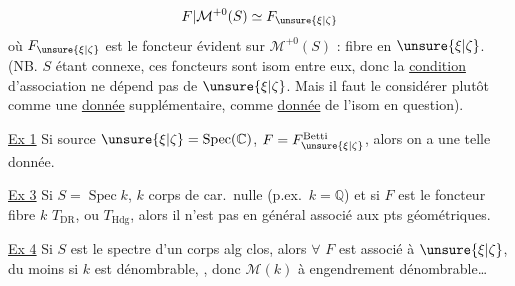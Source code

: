 \[
F|\mathcal{M}^{+0}(S)\simeq F_{\unsure{\xi|\zeta}}
\]
où $F_{\unsure{\xi|\zeta}}$ est le foncteur évident sur $\mathcal{M}^{+0}(S)$ : fibre en $\unsure{\xi|\zeta}$.
(NB. $S$ étant connexe, ces foncteurs sont isom entre eux, donc la \uline{condition} d'association ne dépend pas de $\unsure{\xi|\zeta}$. Mais il faut le considérer plutôt comme une \uline{donnée} supplémentaire, comme \uline{donnée} de l'isom en question).

\uline{Ex 1} Si source $\unsure{\xi|\zeta}=\operatorname{Spec}(\mathbb{C})$,  $F=F_{\unsure{\xi|\zeta}}^{\mathrm{Betti}}$, alors on a une telle donnée.

\uline{Ex 3} Si $S=\operatorname{Spec}k$, $k$ corps de car.\ nulle (p.ex.\ $k=\mathbb{Q}$) et si $F$ est le foncteur fibre  $k$ $T_{\mathrm{DR}}$,  ou $T_{\mathrm{Hdg}}$, alors il n'est pas en général associé aux pts géométriques.

\uline{Ex 4} Si  $S$ est le spectre d'un corps alg clos, alors $\forall$ $F$ est associé à $\unsure{\xi|\zeta}$, du moins si $k$ est dénombrable, , donc $\mathcal{M}(k)$ à engendrement dénombrable\dots

